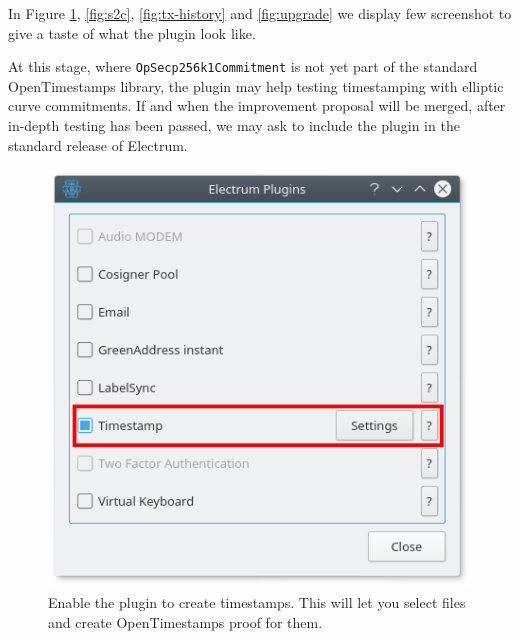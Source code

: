 In Figure \ref{fig:enable-plugin}, \ref{fig:s2c}, \ref{fig:tx-history} and \ref{fig:upgrade} we display few screenshot to give a taste of what the plugin look like.

At this stage, where \verb|OpSecp256k1Commitment| is not yet part of the standard OpenTimestamps library, the plugin may help testing timestamping with elliptic curve commitments. 
If and when the improvement proposal will be merged, after in-depth testing has been passed, we may ask to include the plugin in the standard release of Electrum.

\begin{figure}
	\begin{center}
		\includegraphics[width=0.5\linewidth]{Images/enable-plugin.png}
		\caption[Enable the plugin to create timestamps.]{Enable the plugin to create timestamps. This will let you select files and create OpenTimestamps proof for them.}
		\label{fig:enable-plugin}
	\end{center}
\end{figure} 

